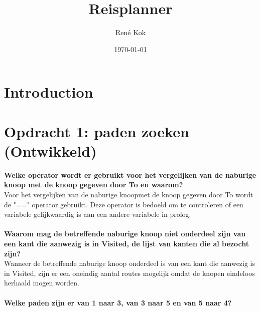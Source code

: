 \documentclass{uva-inf-article}
\title{Reisplanner}
\author{René Kok}
\date{\today}
\begin{document}
\maketitle




\section{Introduction}
\lipsum[1]


\section{Opdracht 1: paden zoeken (Ontwikkeld)}
\textbf{Welke operator wordt er gebruikt voor het vergelijken van de naburige knoop met de knoop gegeven door To en waarom?}\\
Voor het vergelijken van de naburige knoopmet de knoop gegeven door To wordt de "==" operator gebruikt. 
Deze operator is bedoeld om te controleren of een variabele gelijkwaardig is aan een andere variabele in prolog.\\\\  
\textbf{Waarom mag de betreffende naburige knoop niet onderdeel zijn van een kant die aanwezig is in Visited, de lijst van kanten die al bezocht zijn?}\\
Wanneer de betreffende naburige knoop onderdeel is van een kant die aanwezig is in Visited, 
zijn er een oneindig aantal routes mogelijk omdat de knopen eindeloos herhaald mogen worden.\\\\
\textbf{Welke paden zijn er van 1 naar 3, van 3 naar 5 en van 5 naar 4?}\\
\end{document}
